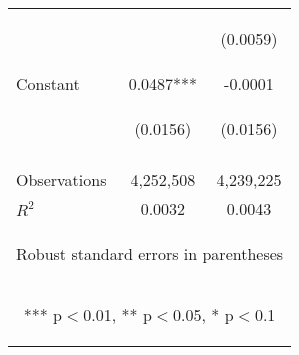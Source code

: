 \begin{center}
\begin{tabular}{lcc}
\vspace{4pt} & \begin{footnotesize}\end{footnotesize} & \begin{footnotesize}(0.0059)\end{footnotesize} \\
Constant & 0.0487*** & -0.0001 \\
 & \begin{footnotesize}(0.0156)\end{footnotesize} & \begin{footnotesize}(0.0156)\end{footnotesize} \\
\vspace{4pt} & \begin{footnotesize}\end{footnotesize} & \begin{footnotesize}\end{footnotesize} \\
Observations & 4,252,508 & 4,239,225 \\
 $R^2$ & 0.0032 & 0.0043 \\ \hline
\multicolumn{3}{c}{\begin{footnotesize} Robust standard errors in parentheses\end{footnotesize}} \\
\multicolumn{3}{c}{\begin{footnotesize} *** p$<$0.01, ** p$<$0.05, * p$<$0.1\end{footnotesize}} \\
\end{tabular}
\end{center}
